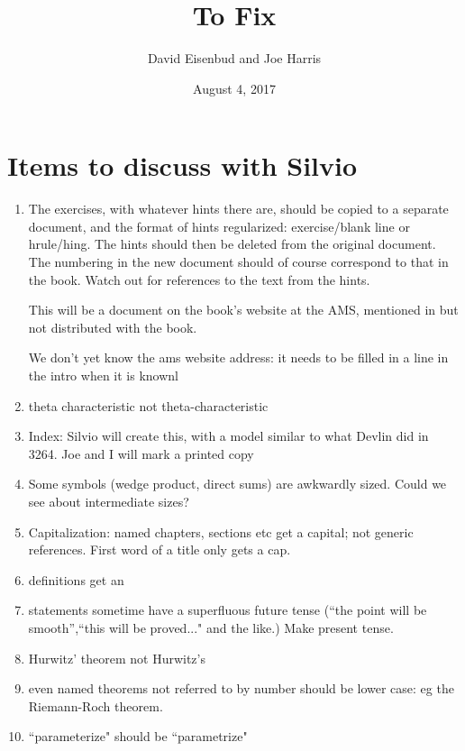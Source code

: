 \documentclass[12pt, leqno]{book}
\date{August 4, 2017}
\title{To Fix}
\author{David Eisenbud and Joe Harris }
\begin{document}
\maketitle

\setlength{\parskip}{5pt}

 
 \section{Items to discuss with Silvio}
 
 \begin{enumerate}
 
 \item The exercises, with whatever hints there are, should be copied to a separate document, and the format of hints regularized: 
 exercise/blank line or hrule/hing. The hints should then be deleted from the original document. The numbering in the new document should of course correspond to that in the book. Watch out for references to the text from the hints.
 
 This will be a document on the book's website at the AMS, 
 mentioned in but not distributed with the book.
 
 We don't yet know the ams website address: it needs to be filled in a line in the intro when it is knownl
   
\item theta characteristic not theta-characteristic 

 \item Index: Silvio will create this, with a model similar to what Devlin did in 3264. Joe and I will mark a printed copy
 
 \item Some symbols (wedge product, direct sums) are awkwardly sized. Could we see about intermediate sizes?
 
 \item Capitalization: named chapters, sections etc get a capital; not generic references. First word of a title only gets a cap.
 
 \item definitions get an \emph{}
 
 \item statements sometime have a superfluous future tense (``the point will be smooth'',``this will be proved..." and the like.) Make present tense.
 
 \item Hurwitz' theorem not Hurwitz's 
 
 \item even named theorems not referred to by number should be lower case: eg the Riemann-Roch theorem. 
 
\item  ``parameterize" should be  ``parametrize"
 
 \end{enumerate}
\end{document}

